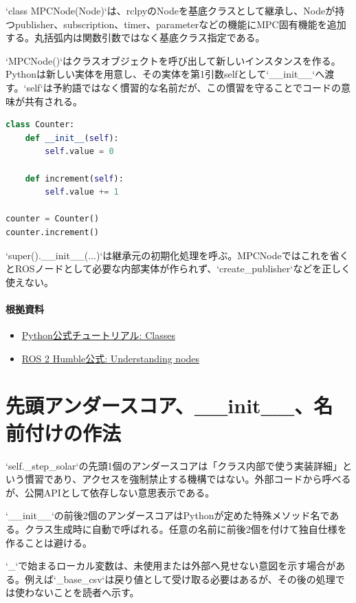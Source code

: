 \documentclass[a4paper,11pt]{article}
\begin{document}
`class MPCNode(Node)`は、rclpyのNodeを基底クラスとして継承し、Nodeが持つpublisher、subscription、timer、parameterなどの機能にMPC固有機能を追加する。丸括弧内は関数引数ではなく基底クラス指定である。


`MPCNode()`はクラスオブジェクトを呼び出して新しいインスタンスを作る。Pythonは新しい実体を用意し、その実体を第1引数selfとして`\_\_init\_\_`へ渡す。`self`は予約語ではなく慣習的な名前だが、この慣習を守ることでコードの意味が共有される。


\begin{lstlisting}[language=python]
class Counter:
    def __init__(self):
        self.value = 0

    def increment(self):
        self.value += 1

counter = Counter()
counter.increment()
\end{lstlisting}


`super().\_\_init\_\_(...)`は継承元の初期化処理を呼ぶ。MPCNodeではこれを省くとROSノードとして必要な内部実体が作られず、`create\_publisher`などを正しく使えない。

\paragraph{根拠資料}
\begin{itemize}[leftmargin=1.6em]
\item \href{https://docs.python.org/3/tutorial/classes.html}{Python公式チュートリアル: Classes}
\item \href{https://docs.ros.org/en/humble/Tutorials/Beginner-CLI-Tools/Understanding-ROS2-Nodes/Understanding-ROS2-Nodes.html}{ROS 2 Humble公式: Understanding nodes}
\end{itemize}

\section{先頭アンダースコア、\_\_init\_\_、名前付けの作法}
`self.\_step\_solar`の先頭1個のアンダースコアは「クラス内部で使う実装詳細」という慣習であり、アクセスを強制禁止する機構ではない。外部コードから呼べるが、公開APIとして依存しない意思表示である。


`\_\_init\_\_`の前後2個のアンダースコアはPythonが定めた特殊メソッド名である。クラス生成時に自動で呼ばれる。任意の名前に前後2個を付けて独自仕様を作ることは避ける。


`\_`で始まるローカル変数は、未使用または外部へ見せない意図を示す場合がある。例えば`\_base\_csv`は戻り値として受け取る必要はあるが、その後の処理では使わないことを読者へ示す。
\end{document}
